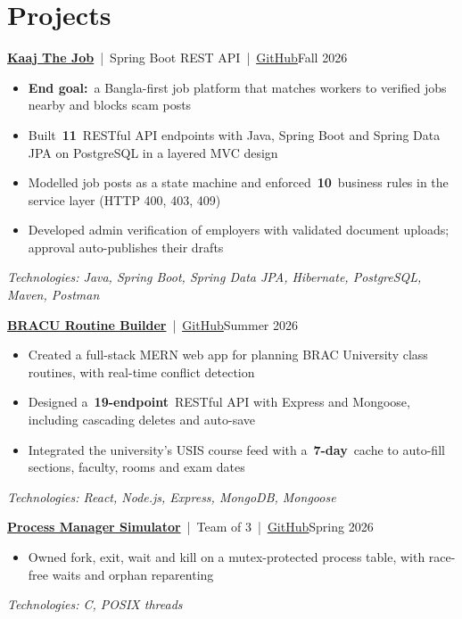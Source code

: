 \documentclass[10pt]{article}
\providecommand{\pdffakespace}{}                        %
\newcommand{\ssp}{\pdffakespace\ }                      %
\newcommand{\sep}{\ssp\textcolor{muted}{|}\ssp}                         %
\newcommand{\link}[2]{\href{#1}{\textcolor{linkc}{\underline{#2}}}}     %
\newcommand{\entry}[3]{\textbf{#1}\sep #2\pdffakespace\hfill\textcolor{muted}{#3}\par} %
\newcommand{\tech}[1]{{\leftskip=13pt\textit{\textcolor{muted}{Technologies: #1}}\par}}
\newcommand{\gap}{\vspace{3.5pt}}
\begin{document}
\section{Projects}
\entry{\href{https://github.com/ahsanauddry027/SpringBoot_PostgreSQL_Api}{Kaaj The Job}}{Spring Boot REST API\sep\link{https://github.com/ahsanauddry027/SpringBoot_PostgreSQL_Api}{GitHub}}{Fall 2026}
\begin{itemize}
  \item \textbf{End goal:}\ssp a Bangla-first job platform that matches workers to verified jobs nearby and blocks scam posts
  \item Built\ssp\textbf{11}\ssp RESTful API endpoints with Java, Spring Boot and Spring Data JPA on PostgreSQL in a layered MVC design
  \item Modelled job posts as a state machine and enforced\ssp\textbf{10}\ssp business rules in the service layer (HTTP 400, 403, 409)
  \item Developed admin verification of employers with validated document uploads; approval auto-publishes their drafts
\end{itemize}
\tech{Java, Spring Boot, Spring Data JPA, Hibernate, PostgreSQL, Maven, Postman}
\gap
\entry{\href{https://github.com/ahsanauddry027/BRACU_RoutineMaker}{BRACU Routine Builder}}{\link{https://github.com/ahsanauddry027/BRACU_RoutineMaker}{GitHub}}{Summer 2026}
\begin{itemize}
  \item Created a full-stack MERN web app for planning BRAC University class routines, with real-time conflict detection
  \item Designed a\ssp\textbf{19-endpoint}\ssp RESTful API with Express and Mongoose, including cascading deletes and auto-save
  \item Integrated the university's USIS course feed with a\ssp\textbf{7-day}\ssp cache to auto-fill sections, faculty, rooms and exam dates
\end{itemize}
\tech{React, Node.js, Express, MongoDB, Mongoose}
\gap
\entry{\href{https://github.com/ahsanauddry027/CSE321_project_Process_manager}{Process Manager Simulator}}{Team of 3\sep\link{https://github.com/ahsanauddry027/CSE321_project_Process_manager}{GitHub}}{Spring 2026}
\begin{itemize}
  \item Owned fork, exit, wait and kill on a mutex-protected process table, with race-free waits and orphan reparenting
\end{itemize}
\tech{C, POSIX threads}
\end{document}
